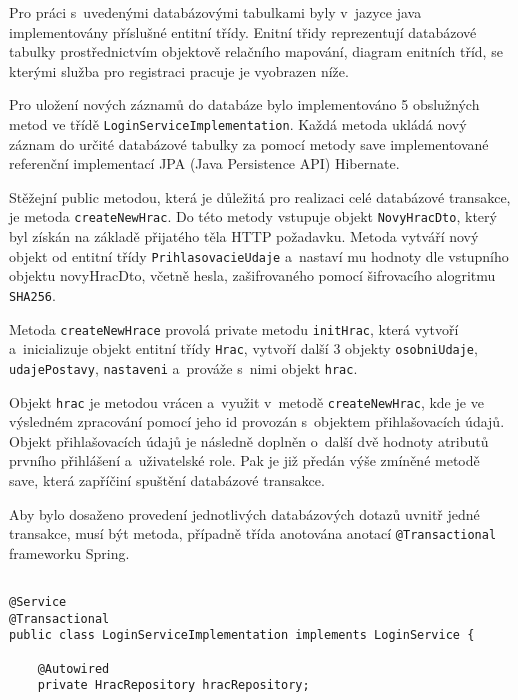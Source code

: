 \documentclass[12pt]{article}
\begin{document}
{Pro práci s~uvedenými databázovými tabulkami byly v~jazyce java implementovány příslušné entitní třídy.
Enitní třidy reprezentují databázové tabulky prostřednictvím objektově relačního mapování,
diagram enitních tříd, se kterými služba pro registraci pracuje je vyobrazen níže.

\obrazek
{}

\clearpage

Pro uložení nových záznamů do databáze bylo implementováno 5 obslužných metod ve třídě \texttt{LoginServiceImplementation}.
Každá metoda ukládá nový záznam do určité databázové tabulky
za pomocí metody save implementované referenční implementací JPA (Java Persistence API) Hibernate.

Stěžejní public metodou, která je důležitá pro realizaci celé databázové transakce, je metoda \texttt{createNewHrac}.
Do této metody vstupuje objekt \texttt{NovyHracDto}, který byl získán na základě přijatého těla HTTP požadavku.
Metoda vytváří nový objekt od entitní třídy \texttt{PrihlasovacieUdaje} a~nastaví mu hodnoty dle vstupního objektu novyHracDto,
včetně hesla, zašifrovaného pomocí šifrovacího alogritmu \texttt{SHA256}.

Metoda \texttt{createNewHrace} provolá private metodu \texttt{initHrac},
která vytvoří a~inicializuje objekt entitní třídy \texttt{Hrac}, vytvoří další 3 objekty \texttt{osobniUdaje},
\texttt{udajePostavy}, \texttt{nastaveni} a~prováže s~nimi objekt \texttt{hrac}.

Objekt \texttt{hrac} je metodou vrácen a~využit v~metodě \texttt{createNewHrac},
kde je ve výsledném zpracování pomocí jeho id provozán s~objektem přihlašovacích údajů.
Objekt přihlašovacích údajů je následně doplněn o~další dvě hodnoty atributů prvního přihlášení a~uživatelské role.
Pak je již předán výše zmíněné metodě save, která zapříčiní spuštění databázové transakce.

Aby bylo dosaženo provedení jednotlivých databázových dotazů uvnitř jedné transakce,
musí být metoda, případně třída anotována anotací \texttt{@Transactional} frameworku Spring. 

\clearpage

\begin{lstlisting}

@Service
@Transactional
public class LoginServiceImplementation implements LoginService {
    
    @Autowired
    private HracRepository hracRepository;


\end{lstlisting}}
\end{document}
